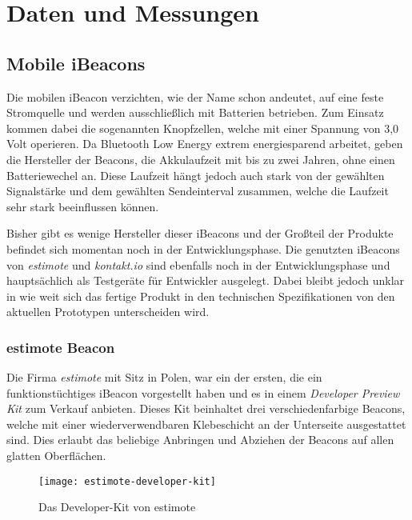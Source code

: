 \chapter{Daten und Messungen}
\label{chap:dataandmeasure}

\section{Mobile iBeacons}
\label{sec:dataandmeasurement:mobilebeacon}
Die mobilen iBeacon verzichten, wie der Name schon andeutet, auf eine feste Stromquelle und werden ausschließlich mit Batterien betrieben.
Zum Einsatz kommen dabei die sogenannten Knopfzellen, welche mit einer Spannung von 3,0 Volt operieren.
Da Bluetooth Low Energy extrem energiesparend arbeitet, geben die Hersteller der Beacons, die Akkulaufzeit mit bis zu zwei Jahren, ohne einen Batteriewechel an. Diese Laufzeit hängt jedoch auch stark von der gewählten Signalstärke und dem gewählten Sendeinterval zusammen, welche die Laufzeit sehr stark beeinflussen können.

Bisher gibt es wenige Hersteller dieser iBeacons und der Großteil der Produkte befindet sich momentan noch in der Entwicklungsphase. Die genutzten iBeacons von \emph{estimote} und \emph{kontakt.io} sind ebenfalls noch in der Entwicklungsphase und hauptsächlich als Testgeräte für Entwickler ausgelegt. Dabei bleibt jedoch unklar in wie weit sich das fertige Produkt in den technischen Spezifikationen von den aktuellen Prototypen unterscheiden wird.

\subsection{estimote Beacon}
\label{sec:dataandmeasurement:mobilebeacon:estimote}
Die Firma \emph{estimote} mit Sitz in Polen, war ein der ersten, die ein funktionstüchtiges iBeacon vorgestellt haben und es in einem \emph{Developer Preview Kit} zum Verkauf anbieten.
Dieses Kit beinhaltet drei verschiedenfarbige Beacons, welche mit einer wiederverwendbaren Klebeschicht an der Unterseite ausgestattet sind. Dies erlaubt das beliebige Anbringen und Abziehen der Beacons auf allen glatten Oberflächen.
\begin{figure}[htb!]
		\centering
	\texttt{[image: estimote-developer-kit]}
	\caption{Das Developer-Kit von estimote}
	\label{estimote-developer-kit}
\end{figure}

